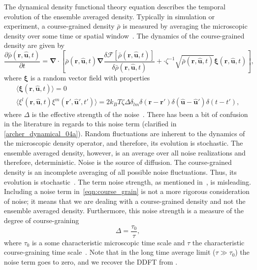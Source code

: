 The dynamical density functional theory equation 
describes the temporal evolution of the ensemble averaged density. Typically in
simulation or experiment, a course-grained density $\bar{\rho}$ is measured by
averaging the microscopic density over some time or spatial
window~\cite{archer_dynamical_04a}. The dynamics of the course-grained density
are given by~\cite{dean_langevin_96, archer_dynamical_04a,
  mishra_fluctuations_10}
%
\begin{equation}\label{eqn:course_grain}
  \frac{\partial \bar{\rho} ( \bm{r},\hat{\bm{u}},t )}{\partial t} = 
  \boldsymbol{\nabla} \cdot \left[ \bar{\rho}( \bm{r},\hat{\bm{u}},t )
    \boldsymbol{\nabla} \frac{\delta \mathcal{F} 
      \left[ \bar{\rho}( \bm{r}, \hat{\bm{u}},t ) \right]}
    {\delta \bar{\rho}( \bm{r},\hat{\bm{u}},t )}
    + \cdot \zeta^{-1} \sqrt{\bar{\rho}( \bm{r},\hat{\bm{u}},t )}
    \bm{\xi}(\bm{r},\hat{\bm{u}},t)\right],
\end{equation}
%
where $\bm{\xi}$ is a random vector field with properties
%
\begin{gather}
  \langle \boldsymbol{\xi}(\bm{r},\hat{\bm{u}},t) \rangle = 0 \\
  \langle \xi^l(\bm{r},\hat{\bm{u}},t) \xi^m (\bm{r}',\hat{\bm{u}}',t') \rangle 
  = 2 k_B T \zeta
  \Delta \delta_{lm} \delta( \bm{r} - \bm{r}' ) \delta( \bm{\hat{u}} -
  \bm{\hat{u}}' ) \delta( t - t' ),
\end{gather}
%
where $\Delta$ is the effective strength of the
noise~\cite{mishra_fluctuations_10}.  There has been a bit of confusion in the
literature in regards to this noise term (clarified in
\cref{archer_dynamical_04a}). Random fluctuations are inherent to the dynamics
of the microscopic density operator, and therefore, its evolution is stochastic.
The ensemble averaged density, however, is an average over all noise
realizations and therefore, deterministic. Noise is the source of diffusion. The course-grained density is
an incomplete averaging of all possible noise fluctuations. Thus, its evolution
is stochastic~\cite{archer_dynamical_04a}. The term noise strength, as mentioned
in~\cite{mishra_fluctuations_10}, is misleading.  Including a noise term
in~\ref{eqn:course_grain} is not a more rigorous consideration of noise; it
means that we are dealing with a course-grained density and not the ensemble
averaged density. Furthermore, this noise strength is a measure of the
degree of course-graining
% 
\begin{equation}
  \Delta = \frac{\tau_0}{\tau},
\end{equation}
%
where $\tau_0$ is a some characteristic microscopic time scale and $\tau$ the
characteristic course-graining time scale~\cite{archer_dynamical_04a}. Note that
in the long time average limit ($\tau \gg \tau_0$) the noise term goes to zero,
and we recover the DDFT  from .

